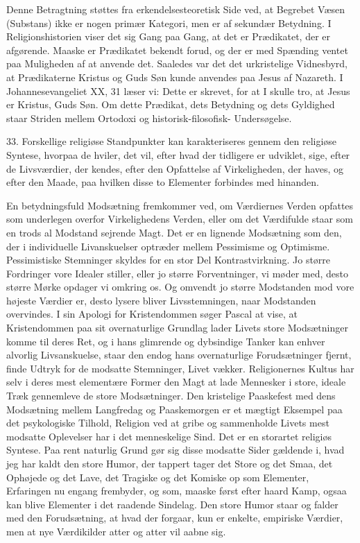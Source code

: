 \documentclass[12pt]{article}
\newcommand{\apage}[1]{\marginnote{\footnotesize\textit{[#1]}}}
\begin{document}
Denne Betragtning støttes fra erkendelsesteoretisk Side ved, at Begrebet
\guillemotright{}Væsen\guillemotleft{} (Substans) ikke er nogen primær
Kategori, men er af sekundær Betydning. I Religionshistorien viser det sig Gang
paa Gang, at det er Prædikatet, der er afgørende. Maaske er Prædikatet bekendt
forud, og der er med Spænding ventet paa Muligheden af at anvende det. Saaledes
var det det urkristelige Vidnesbyrd, at Prædikaterne
\guillemotright{}Kristus\guillemotleft{} og \guillemotright{}Guds
Søn\guillemotleft{} kunde anvendes paa Jesus af Nazareth. I Johannesevangeliet
XX, 31 læser vi: \guillemotright{}Dette er skrevet, for at I skulle tro, at
Jesus er Kristus, Guds Søn.\guillemotleft{} Om dette Prædikat, dets Betydning
og dets Gyldighed staar Striden mellem Ortodoxi og historisk-filosofisk-
Undersøgelse.

33. Forskellige religiøse Standpunkter kan karakteriseres gennem den religiøse
Syntese, hvorpaa de hviler, det vil, efter hvad der tidligere er udviklet,
sige, efter de Livsværdier, der kendes, efter den Opfattelse af Virkeligheden,
\setcounter{footnote}{0}%
\apage{111}der haves, og efter den Maade, paa hvilken disse to Elementer
forbindes med hinanden.

En betydningsfuld Modsætning fremkommer ved, om Værdiernes Verden opfattes som
underlegen overfor Virkelighedens Verden, eller om det Værdifulde staar som en
trods al Modstand sejrende Magt. Det er en lignende Modsætning som den, der i
individuelle Livanskuelser optræder mellem Pessimisme og Optimisme.
Pessimistiske Stemninger skyldes for en stor Del Kontrastvirkning. Jo større
Fordringer vore Idealer stiller, eller jo større Forventninger, vi møder med,
desto større Mørke opdager vi omkring os. Og omvendt jo større Modstanden mod
vore højeste Værdier er, desto lysere bliver Livsstemningen, naar Modstanden
overvindes. I sin Apologi for Kristendommen søger Pascal at vise, at
Kristendommen paa sit overnaturlige Grundlag lader Livets store Modsætninger
komme til deres Ret, og i hans glimrende og dybsindige Tanker kan enhver
alvorlig Livsanskuelse, staar den endog hans overnaturlige Forudsætninger
fjernt, finde Udtryk for de modsatte Stemninger, Livet vækker. Religionernes
Kultus har selv i deres mest elementære Former den Magt at lade Mennesker i
store, ideale Træk gennemleve de store Modsætninger. Den kristelige Paaskefest
med dens Modsætning mellem Langfredag og Paaskemorgen er et mægtigt Eksempel
paa det psykologiske Tilhold, Religion ved at gribe og sammenholde Livets mest
modsatte Oplevelser har i det menneskelige Sind. Det er en storartet religiøs
Syntese. Paa rent naturlig Grund gør sig disse modsatte Sider gældende i, hvad
jeg har kaldt den store Humor, der tappert tager det Store og det Smaa, det
Ophøjede og det Lave, det Tragiske og det Komiske op som Elementer, Erfaringen
nu engang frembyder, og som, maaske først efter haard Kamp, ogsaa kan blive
\setcounter{footnote}{0}%
\apage{112}Elementer i det raadende Sindelag. Den store Humor staar og falder
med den Forudsætning, at hvad der forgaar, kun er enkelte, empiriske Værdier,
men at nye Værdikilder atter og atter vil aabne sig.
\end{document}
